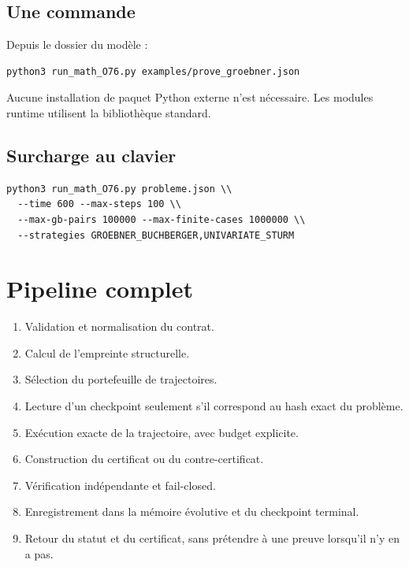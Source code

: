 \documentclass[11pt,a4paper]{article}
\begin{document}
\subsection{Une commande}
Depuis le dossier du modèle :
\begin{verbatim}
python3 run_math_O76.py examples/prove_groebner.json
\end{verbatim}
Aucune installation de paquet Python externe n'est nécessaire. Les modules runtime utilisent la bibliothèque standard.

\subsection{Surcharge au clavier}
\begin{verbatim}
python3 run_math_O76.py probleme.json \\
  --time 600 --max-steps 100 \\
  --max-gb-pairs 100000 --max-finite-cases 1000000 \\
  --strategies GROEBNER_BUCHBERGER,UNIVARIATE_STURM
\end{verbatim}

\section{Pipeline complet}
\begin{enumerate}
\item Validation et normalisation du contrat.
\item Calcul de l'empreinte structurelle.
\item Sélection du portefeuille de trajectoires.
\item Lecture d'un checkpoint seulement s'il correspond au hash exact du problème.
\item Exécution exacte de la trajectoire, avec budget explicite.
\item Construction du certificat ou du contre-certificat.
\item Vérification indépendante et fail-closed.
\item Enregistrement dans la mémoire évolutive et du checkpoint terminal.
\item Retour du statut et du certificat, sans prétendre à une preuve lorsqu'il n'y en a pas.
\end{enumerate}
\end{document}
